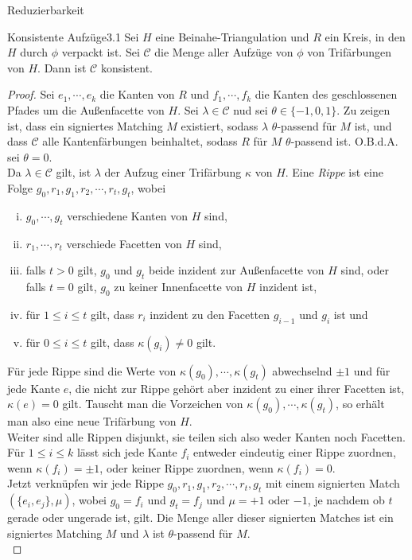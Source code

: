 \begin{section}{Reduzierbarkeit}
 \begin{satzl}{Konsistente Aufzüge}{3.1}
  Sei $H$ eine Beinahe-Triangulation und $R$ ein Kreis, in den $H$ durch $\phi$ verpackt ist. Sei $\mathscr{C}$ die Menge aller Aufzüge von $\phi$ von Trifärbungen von $H$. Dann ist $\mathscr{C}$ konsistent.
 \end{satzl}
 \begin{proof}
  Sei $e_1,\cdots,e_k$ die Kanten von $R$ und $f_1,\cdots,f_k$ die Kanten des geschlossenen Pfades um die Außenfacette von $H$. Sei $\lambda \in \mathscr{C}$ nud sei $\theta \in \{-1,0,1\}$. Zu zeigen ist, dass ein signiertes Matching $M$ existiert, sodass $\lambda$ $\theta$-passend für $M$ ist, und dass $\mathscr{C}$ alle Kantenfärbungen beinhaltet, sodass $R$ für $M$ $\theta$-passend ist. O.B.d.A. sei $\theta = 0$.\\
  Da $\lambda \in \mathscr{C}$ gilt, ist $\lambda$ der Aufzug einer Trifärbung $\kappa$ von $H$. Eine \textit{Rippe} ist eine Folge $g_0,r_1,g_1,r_2,\cdots,r_t,g_t$, wobei
  \begin{enumerate}[(i)]
   \item $g_0,\cdots,g_t$ verschiedene Kanten von $H$ sind,
   \item $r_1,\cdots,r_t$ verschiede Facetten von $H$ sind,
   \item falls $t >0$ gilt, $g_0$ und $g_t$ beide inzident zur Außenfacette von $H$ sind, oder falls $t=0$ gilt, $g_0$ zu keiner Innenfacette von $H$ inzident ist,
   \item für $1\leq i\leq t$ gilt, dass $r_i$ inzident zu den Facetten $g_{i-1}$ und $g_i$ ist und
   \item für $0\leq i\leq t$ gilt, dass $\kappa(g_i) \neq 0$ gilt.
  \end{enumerate}
  Für jede Rippe sind die Werte von $\kappa(g_0),\cdots,\kappa(g_t)$ abwechselnd $\pm 1$ und für jede Kante $e$, die nicht zur Rippe gehört aber inzident zu einer ihrer Facetten ist, $\kappa(e) = 0$ gilt. Tauscht man die Vorzeichen von $\kappa(g_0),\cdots,\kappa(g_t)$, so erhält man also eine neue Trifärbung von $H$.\\
  Weiter sind alle Rippen disjunkt, sie teilen sich also weder Kanten noch Facetten. Für $1 \leq i \leq k$ lässt sich jede Kante $f_i$ entweder eindeutig einer Rippe zuordnen, wenn $\kappa(f_i) = \pm 1$, oder keiner Rippe zuordnen, wenn $\kappa(f_i)=0$.\\
  Jetzt verknüpfen wir jede Rippe $g_0,r_1,g_1,r_2,\cdots,r_t,g_t$ mit einem signierten Match $(\{e_i,e_j\},\mu)$, wobei $g_0 = f_i$ und $g_t = f_j$ und $\mu = +1$ oder $-1$, je nachdem ob $t$ gerade oder ungerade ist, gilt. Die Menge aller dieser signierten Matches ist ein signiertes Matching $M$ und $\lambda$ ist $\theta$-passend für $M$.\\

\end{proof}
\end{section}
